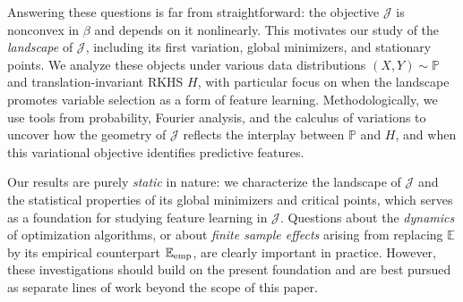 \documentclass[sn-mathphys-num]{sn-jnl}%
\numberwithin{equation}{section}
\newcommand{\E}{\mathbb{E}}
\renewcommand{\P}{\mathbb{P}}
\theoremstyle{thmstyleone}%
\theoremstyle{thmstyletwo}%
\theoremstyle{thmstylethree}%
\begin{document}
Answering these questions is far from straightforward: the objective $\mathcal{J}$ is nonconvex in $\beta$ and depends on it nonlinearly. This motivates our study of the \emph{landscape} of $\mathcal{J}$, including its first variation, global minimizers, and stationary points. We analyze these objects under various data distributions $(X,Y)\sim\P$ and translation-invariant RKHS $H$, with particular focus on when the landscape promotes variable selection as a form of feature learning. Methodologically, we use tools from probability, Fourier analysis, and the calculus of variations to uncover how the geometry of $\mathcal{J}$ reflects the interplay between $\P$ and $H$, and when this variational objective identifies predictive features.


 
Our results are purely \emph{static} in nature: we characterize the landscape of $\mathcal{J}$ and the statistical properties of its global minimizers and critical points, which serves as a foundation for studying feature learning in $\mathcal{J}$. Questions about the \emph{dynamics} of optimization algorithms, or about \emph{finite sample effects} arising from replacing $\E$ by its empirical counterpart $\E_{{\rm emp}}$, are clearly important in practice. However, these investigations should build on the present foundation and are best pursued as separate lines of work beyond the scope of this paper.


\end{document}

